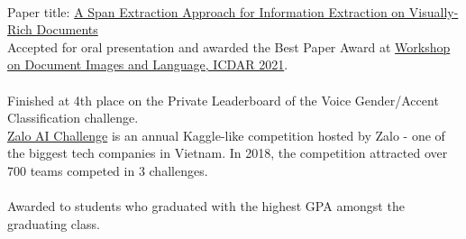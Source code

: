 \\
Paper title: \href{https://aps.arxiv.org/abs/2106.00978}{A Span Extraction Approach for Information Extraction on Visually-Rich Documents}\\
\indent Accepted for oral presentation and awarded the Best Paper Award at \href{https://dil2021.github.io/index.html}{Workshop on Document Images and Language, ICDAR 2021}.\\

\\
Finished at 4th place on the Private Leaderboard of the Voice Gender/Accent Classification challenge.\\
\indent \href{https://challenge.zalo.ai}{Zalo AI Challenge} is an annual Kaggle-like competition hosted
by Zalo - one of the biggest tech companies in Vietnam. In 2018, the competition attracted
over 700 teams competed in 3 challenges.\\

\\
Awarded to students who graduated with the highest GPA amongst the graduating class.\\